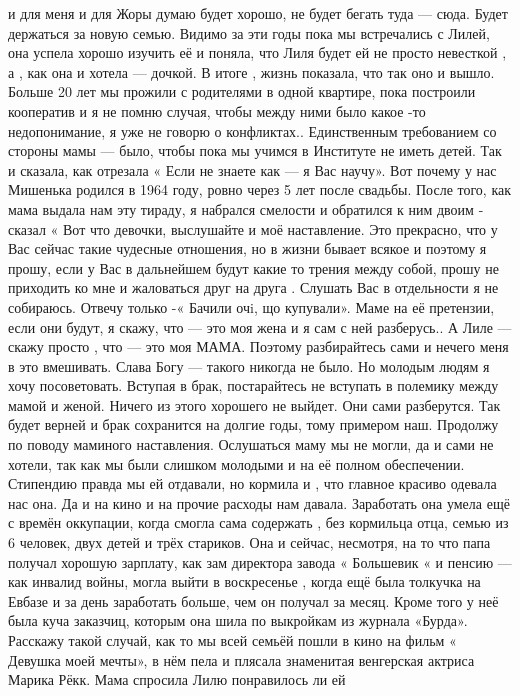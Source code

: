 и для меня и для Жоры думаю будет хорошо, не будет бегать туда — сюда. Будет
держаться за новую семью.  Видимо за эти годы пока мы встречались с Лилей,  она
успела хорошо изучить её и поняла, что Лиля  будет ей не просто невесткой , а ,
как она и хотела — дочкой. В итоге , жизнь показала, что так оно и вышло.
Больше 20 лет мы прожили с родителями в одной квартире, пока построили
кооператив и я не помню случая, чтобы между ними было какое -то недопонимание,
я уже не говорю о конфликтах..  Единственным требованием со стороны мамы —
было,  чтобы пока мы учимся в Институте не иметь детей. Так и сказала, как
отрезала « Если не знаете как — я  Вас научу». Вот почему у нас Мишенька
родился в 1964 году, ровно через 5 лет после свадьбы. После того, как мама
выдала нам эту тираду, я  набрался смелости и обратился к ним двоим - сказал «
Вот что  девочки, выслушайте и моё наставление. Это прекрасно, что у Вас сейчас
такие чудесные отношения, но в жизни бывает всякое и поэтому я прошу, если у
Вас в дальнейшем будут какие то трения  между собой, прошу не приходить ко мне
и жаловаться друг на друга . Слушать Вас в отдельности я  не собираюсь.  Отвечу
только -« Бачили очi, що купували». Маме на её претензии, если они будут,  я
скажу, что — это моя жена и я сам с ней разберусь.. А Лиле — скажу просто  ,
что — это моя  МАМА. Поэтому разбирайтесь сами и нечего меня в это вмешивать.
Слава Богу — такого никогда не было. Но молодым людям я хочу посоветовать.
Вступая в брак, постарайтесь не вступать в полемику между мамой и женой. Ничего
из этого хорошего не выйдет. Они сами разберутся. Так будет верней и брак
сохранится на долгие годы, тому примером наш.  Продолжу по поводу маминого
наставления. Ослушаться маму мы не могли, да и сами не хотели, так как мы были
слишком молодыми и на её полном обеспечении. Стипендию правда мы ей отдавали,
но кормила и , что главное красиво одевала нас она. Да и на кино и на прочие
расходы нам давала. Заработать она умела ещё с времён оккупации, когда смогла
сама  содержать , без кормильца отца, семью из 6 человек, двух детей и трёх
стариков. Она и сейчас, несмотря, на то что папа получал  хорошую зарплату, как
зам директора завода « Большевик « и пенсию — как инвалид войны, могла выйти в
воскресенье , когда ещё была толкучка на Евбазе и за день заработать больше,
чем он получал за месяц. Кроме того  у неё была куча заказчиц, которым она шила
по выкройкам из журнала «Бурда». Расскажу такой случай, как то мы всей семьёй
пошли в кино на фильм « Девушка моей мечты», в нём пела и плясала знаменитая
венгерская актриса Марика  Рёкк. Мама спросила Лилю понравилось ли ей
